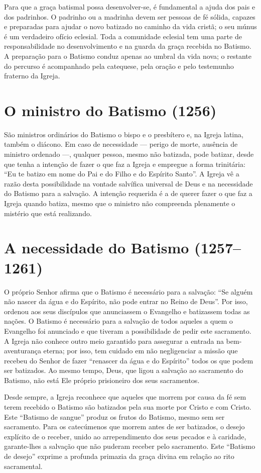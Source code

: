 Para que a graça batismal possa desenvolver-se, é fundamental a ajuda dos pais e dos padrinhos. O padrinho ou a madrinha devem ser pessoas de fé sólida, capazes e preparadas para ajudar o novo batizado no caminho da vida cristã; o seu múnus é um verdadeiro ofício eclesial. Toda a comunidade eclesial tem uma parte de responsabilidade no desenvolvimento e na guarda da graça recebida no Batismo. A preparação para o Batismo conduz apenas ao umbral da vida nova; o restante do percurso é acompanhado pela catequese, pela oração e pelo testemunho fraterno da Igreja.

\section{O ministro do Batismo (1256)}

São ministros ordinários do Batismo o bispo e o presbítero e, na Igreja latina, também o diácono. Em caso de necessidade --- perigo de morte, ausência de ministro ordenado ---, qualquer pessoa, mesmo não batizada, pode batizar, desde que tenha a intenção de fazer o que faz a Igreja e empregue a forma trinitária: ``Eu te batizo em nome do Pai e do Filho e do Espírito Santo''. A Igreja vê a razão desta possibilidade na vontade salvífica universal de Deus e na necessidade do Batismo para a salvação. A intenção requerida é a de querer fazer o que faz a Igreja quando batiza, mesmo que o ministro não compreenda plenamente o mistério que está realizando.

\section{A necessidade do Batismo (1257--1261)}

O próprio Senhor afirma que o Batismo é necessário para a salvação: ``Se alguém não nascer da água e do Espírito, não pode entrar no Reino de Deus''. Por isso, ordenou aos seus discípulos que anunciassem o Evangelho e batizassem todas as nações. O Batismo é necessário para a salvação de todos aqueles a quem o Evangelho foi anunciado e que tiveram a possibilidade de pedir este sacramento. A Igreja não conhece outro meio garantido para assegurar a entrada na bem-aventurança eterna; por isso, tem cuidado em não negligenciar a missão que recebeu do Senhor de fazer ``renascer da água e do Espírito'' todos os que podem ser batizados. Ao mesmo tempo, Deus, que ligou a salvação ao sacramento do Batismo, não está Ele próprio prisioneiro dos seus sacramentos.

Desde sempre, a Igreja reconhece que aqueles que morrem por causa da fé sem terem recebido o Batismo são batizados pela sua morte por Cristo e com Cristo. Este ``Batismo de sangue'' produz os frutos do Batismo, mesmo sem ser sacramento. Para os catecúmenos que morrem antes de ser batizados, o desejo explícito de o receber, unido ao arrependimento dos seus pecados e à caridade, garante-lhes a salvação que não puderam receber pelo sacramento. Este ``Batismo de desejo'' exprime a profunda primazia da graça divina em relação ao rito sacramental.

